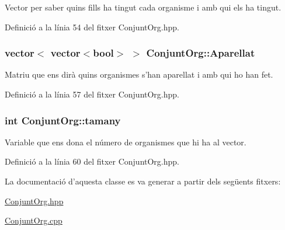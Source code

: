 Vector per saber quins fills ha tingut cada organisme i amb qui els ha tingut. 



Definició a la línia 54 del fitxer Conjunt\-Org.\-hpp.

\hypertarget{class_conjunt_org_a9782fdb4c89e8dd61762453de8f77fcb}{
\subsubsection[{Aparellat}]{\setlength{\rightskip}{0pt plus 5cm}vector$<$ vector$<$bool$>$ $>$ Conjunt\-Org\-::\-Aparellat\hspace{0.3cm}{\ttfamily [private]}}}\label{class_conjunt_org_a9782fdb4c89e8dd61762453de8f77fcb}


Matriu que ens dirà quins organismes s'han aparellat i amb qui ho han fet. 



Definició a la línia 57 del fitxer Conjunt\-Org.\-hpp.

\hypertarget{class_conjunt_org_a468e7686498561628ad731ea196df8b5}{
\subsubsection[{tamany}]{\setlength{\rightskip}{0pt plus 5cm}int Conjunt\-Org\-::tamany\hspace{0.3cm}{\ttfamily [private]}}}\label{class_conjunt_org_a468e7686498561628ad731ea196df8b5}


Variable que ens dona el número de organismes que hi ha al vector. 



Definició a la línia 60 del fitxer Conjunt\-Org.\-hpp.



La documentació d'aquesta classe es va generar a partir dels següents fitxers\-:\begin{DoxyCompactItemize}
\item 
\hyperlink{_conjunt_org_8hpp}{Conjunt\-Org.\-hpp}\item 
\hyperlink{_conjunt_org_8cpp}{Conjunt\-Org.\-cpp}\end{DoxyCompactItemize}
